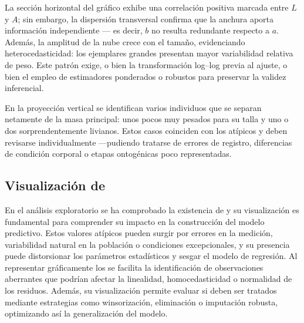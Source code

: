 \documentclass[a4paper,10pt,spanish]{jupyterBook}
\begin{document}
\sphinxAtStartPar
La sección horizontal del gráfico exhibe una correlación positiva marcada entre \(L\) y \(A\); sin embargo, la dispersión transversal confirma que la anchura aporta información independiente — es decir, \(b\) no resulta redundante respecto a \(a\). Además, la amplitud de la nube crece con el tamaño, evidenciando heterocedasticidad: los ejemplares grandes presentan mayor variabilidad relativa de peso. Este patrón exige, o bien la transformación log–log previa al ajuste, o bien el empleo de estimadores ponderados o robustos para preservar la validez inferencial.

\sphinxAtStartPar
En la proyección vertical se identifican varios individuos que se separan netamente de la masa principal: unos pocos muy pesados para su talla y uno o dos sorprendentemente livianos. Estos casos coinciden con los atípicos y deben revisarse individualmente —pudiendo tratarse de errores de registro, diferencias de condición corporal o etapas ontogénicas poco representadas.

\sphinxAtStartPar
{}


\subsection{Visualización de }
\label{\detokenize{content/03/Analisis:visualizacion-de-outliers}}
\sphinxAtStartPar
En el análisis exploratorio se ha comprobado la existencia de  y su visualización es fundamental para comprender su impacto en la construcción del modelo predictivo. Estos valores atípicos pueden surgir por errores en la medición, variabilidad natural en la población o condiciones excepcionales, y su presencia puede distorsionar los parámetros estadísticos y sesgar el modelo de regresión. Al representar gráficamente los  se facilita la identificación de observaciones aberrantes que podrían afectar la linealidad, homocedasticidad o normalidad de los residuos. Además, su visualización permite evaluar si deben ser tratados mediante estrategias como winsorización, eliminación o imputación robusta, optimizando así la generalización del modelo.
\end{document}
